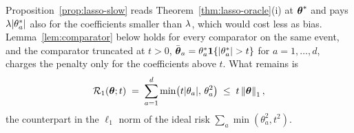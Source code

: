 Proposition~\ref{prop:lasso-slow} reads Theorem~\ref{thm:lasso-oracle}(i) at
$\boldsymbol{\theta}^{*}$ and pays $\lambda|\theta^{*}_{a}|$ also for the coefficients
smaller than $\lambda$, which would cost less as bias. Lemma~\ref{lem:comparator}
below holds for every comparator on the same event, and the comparator
truncated at $t > 0$,
$\bar{\boldsymbol{\theta}}_{a} = \theta^{*}_{a}\mathbf{1}\{|\theta^{*}_{a}| > t\}$ for
$a = 1,\dots,d$, charges the penalty only for the coefficients above $t$. What
remains is
\begin{equation}
  \label{eq:R1}
  \mathcal{R}_{1}(\boldsymbol{\theta};t) \;=\; \sum_{a=1}^{d}\min\bigl(t|\theta_{a}|,\,\theta_{a}^{2}\bigr)
  \;\le\; t\left\lVert \boldsymbol{\theta} \right\rVert_{1},
\end{equation}
the counterpart in the $\ell_1$ norm of the ideal risk
$\sum_{a}\min(\theta_{a}^{2},t^{2})$.

